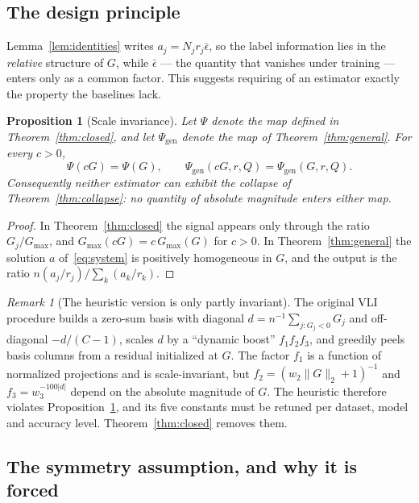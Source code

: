 \documentclass[11pt]{article}
\newtheorem{proposition}{Proposition}
\theoremstyle{remark}
\newtheorem{remark}{Remark}
\begin{document}
\subsection{The design principle}

Lemma~\ref{lem:identities} writes $a_j = N_j r_j \bar\epsilon$, so the
label information lies in the \emph{relative} structure of $G$, while
$\bar\epsilon$ --- the quantity that vanishes under training --- enters only
as a common factor. This suggests requiring of an estimator exactly the
property the baselines lack.

\begin{proposition}[Scale invariance]
\label{prop:invariance}
Let $\Psi$ denote the map defined in Theorem~\ref{thm:closed}, and let
$\Psi_{\mathrm{gen}}$ denote the map of Theorem~\ref{thm:general}. For every
$c>0$,
\[
 \Psi(cG) = \Psi(G), \qquad \Psi_{\mathrm{gen}}(cG, r, Q) = \Psi_{\mathrm{gen}}(G,r,Q) .
\]
Consequently neither estimator can exhibit the collapse of
Theorem~\ref{thm:collapse}: no quantity of absolute magnitude enters either
map.
\end{proposition}

\begin{proof}
In Theorem~\ref{thm:closed} the signal appears only through the ratio
$G_j/G_{\max}$, and $G_{\max}(cG) = c\,G_{\max}(G)$ for $c>0$. In
Theorem~\ref{thm:general} the solution $a$ of~\eqref{eq:system} is
positively homogeneous in $G$, and the output is the ratio
$n(a_j/r_j)/\sum_k (a_k/r_k)$.
\end{proof}

\begin{remark}[The heuristic version is only partly invariant]
The original VLI procedure builds a zero-sum basis with diagonal
$d = n^{-1}\sum_{j:G_j<0}G_j$ and off-diagonal $-d/(C-1)$, scales $d$ by a
``dynamic boost'' $f_1 f_2 f_3$, and greedily peels basis columns from a
residual initialized at $G$. The factor $f_1$ is a function of normalized
projections and is scale-invariant, but $f_2 = (w_2\|G\|_2+1)^{-1}$ and
$f_3 = w_3^{-100|d|}$ depend on the absolute magnitude of $G$. The heuristic
therefore violates Proposition~\ref{prop:invariance}, and its five constants
must be retuned per dataset, model and accuracy level.
Theorem~\ref{thm:closed} removes them.
\end{remark}

\subsection{The symmetry assumption, and why it is forced}
\end{document}
